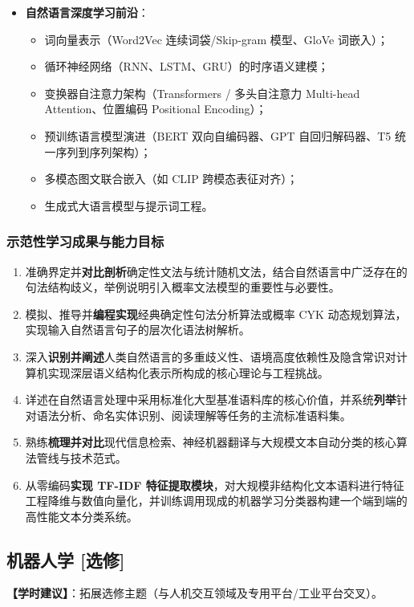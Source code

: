 \begin{itemize}
    \item \textbf{自然语言深度学习前沿}：
    \begin{itemize}
        \item 词向量表示（Word2Vec 连续词袋/Skip-gram 模型、GloVe 词嵌入）；
        \item 循环神经网络（RNN、LSTM、GRU）的时序语义建模；
        \item 变换器自注意力架构（Transformers / 多头自注意力 Multi-head Attention、位置编码 Positional Encoding）；
        \item 预训练语言模型演进（BERT 双向自编码器、GPT 自回归解码器、T5 统一序列到序列架构）；
        \item 多模态图文联合嵌入（如 CLIP 跨模态表征对齐）；
        \item 生成式大语言模型与提示词工程。
    \end{itemize}
\end{itemize}

\subsubsection{示范性学习成果与能力目标}
\begin{enumerate}
    \item 准确界定并\textbf{对比剖析}确定性文法与统计随机文法，结合自然语言中广泛存在的句法结构歧义，举例说明引入概率文法模型的重要性与必要性。
    \item 模拟、推导并\textbf{编程实现}经典确定性句法分析算法或概率 CYK 动态规划算法，实现输入自然语言句子的层次化语法树解析。
    \item 深入\textbf{识别并阐述}人类自然语言的多重歧义性、语境高度依赖性及隐含常识对计算机实现深层语义结构化表示所构成的核心理论与工程挑战。
    \item 详述在自然语言处理中采用标准化大型基准语料库的核心价值，并系统\textbf{列举}针对语法分析、命名实体识别、阅读理解等任务的主流标准语料集。
    \item 熟练\textbf{梳理并对比}现代信息检索、神经机器翻译与大规模文本自动分类的核心算法管线与技术范式。
    \item 从零编码\textbf{实现 TF-IDF 特征提取模块}，对大规模非结构化文本语料进行特征工程降维与数值向量化，并训练调用现成的机器学习分类器构建一个端到端的高性能文本分类系统。
\end{enumerate}

\subsection{机器人学 [选修]}
\textbf{【学时建议】}：拓展选修主题（与人机交互领域及专用平台/工业平台交叉）。

